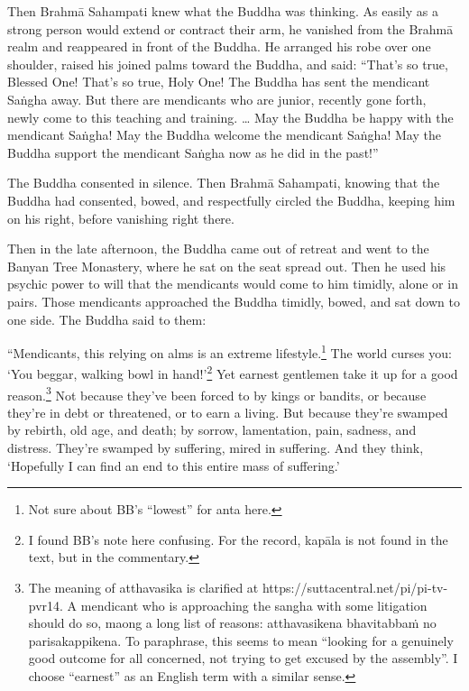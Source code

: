 \documentclass[12pt,openany]{book}%
\begin{document}
Then \textsanskrit{Brahmā} Sahampati knew what the Buddha was thinking. As easily as a strong person would extend or contract their arm, he vanished from the \textsanskrit{Brahmā} realm and reappeared in front of the Buddha. He arranged his robe over one shoulder, raised his joined palms toward the Buddha, and said: “That’s so true, Blessed One! That’s so true, Holy One! The Buddha has sent the mendicant \textsanskrit{Saṅgha} away. But there are mendicants who are junior, recently gone forth, newly come to this teaching and training. … May the Buddha be happy with the mendicant \textsanskrit{Saṅgha}! May the Buddha welcome the mendicant \textsanskrit{Saṅgha}! May the Buddha support the mendicant \textsanskrit{Saṅgha} now as he did in the past!” 

The Buddha consented in silence. Then \textsanskrit{Brahmā} Sahampati, knowing that the Buddha had consented, bowed, and respectfully circled the Buddha, keeping him on his right, before vanishing right there. 

Then in the late afternoon, the Buddha came out of retreat and went to the Banyan Tree Monastery, where he sat on the seat spread out. Then he used his psychic power to will that the mendicants would come to him timidly, alone or in pairs. Those mendicants approached the Buddha timidly, bowed, and sat down to one side. The Buddha said to them: 

“Mendicants, this relying on alms is an extreme lifestyle.\footnote{Not sure about BB’s “lowest” for anta here. } The world curses you: ‘You beggar, walking bowl in hand!’\footnote{I found BB’s note here confusing. For the record, \textsanskrit{kapāla} is not found in the text, but in the commentary. } Yet earnest gentlemen take it up for a good reason.\footnote{The meaning of atthavasika is clarified at https://suttacentral.net/pi/pi-tv-pvr14. A mendicant who is approaching the sangha with some litigation should do so, maong a long list of reasons: atthavasikena \textsanskrit{bhavitabbaṁ} no parisakappikena. To paraphrase, this seems to mean “looking for a genuinely good outcome for all concerned, not trying to get excused by the assembly”. I choose “earnest” as an English term with a similar sense. } Not because they’ve been forced to by kings or bandits, or because they’re in debt or threatened, or to earn a living. But because they’re swamped by rebirth, old age, and death; by sorrow, lamentation, pain, sadness, and distress. They’re swamped by suffering, mired in suffering. And they think, ‘Hopefully I can find an end to this entire mass of suffering.’ 
\end{document}
